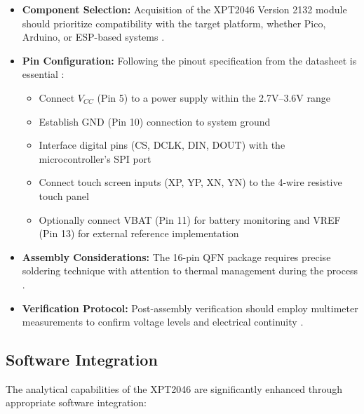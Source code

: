 \begin{itemize}
	\item \textbf{Component Selection:} Acquisition of the XPT2046 Version 2132 module should prioritize compatibility with the target platform, whether Pico, Arduino, or ESP-based systems \cite{ESPHome:2024, Waveshare:2024}.
	
	\item \textbf{Pin Configuration:} Following the pinout specification from the datasheet is essential \cite{ xpt2046:2007}:
	\begin{itemize}
		\item Connect $V_{CC}$ (Pin 5) to a power supply within the 2.7V–3.6V range
		\item Establish GND (Pin 10) connection to system ground
		\item Interface digital pins (CS, DCLK, DIN, DOUT) with the microcontroller's SPI port
		\item Connect touch screen inputs (XP, YP, XN, YN) to the 4-wire resistive touch panel
		\item Optionally connect VBAT (Pin 11) for battery monitoring and VREF (Pin 13) for external reference implementation
	\end{itemize}
	
	\item \textbf{Assembly Considerations:} The 16-pin QFN package requires precise soldering technique with attention to thermal management during the process \cite{ xpt2046:2007}.
	
	\item \textbf{Verification Protocol:} Post-assembly verification should employ multimeter measurements to confirm voltage levels and electrical continuity \cite{Waveshare:2024}.
\end{itemize}

\subsection{Software Integration}
The analytical capabilities of the XPT2046 are significantly enhanced through appropriate software integration:

